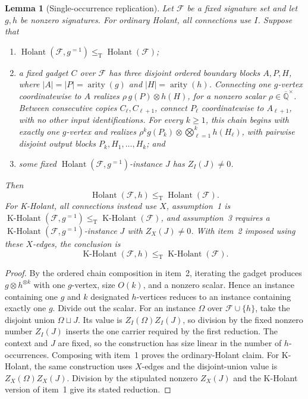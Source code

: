 \documentclass[11pt,letterpaper,onecolumn]{article}
\theoremstyle{plain}
\newtheorem{lemma}[lemma]{Lemma}
\theoremstyle{definition}
\theoremstyle{remark}
\newcommand{\AlgNums}{\overline{\mathbb Q}}
\newcommand{\cF}{\mathcal F}
\newcommand{\Holant}{\operatorname{Holant}}
\newcommand{\KHolant}{\operatorname{K\text{-}Holant}}
\newcommand{\arity}{\operatorname{arity}}
\newcommand{\leT}{\leq_{\mathrm T}}
\begin{document}
\begin{lemma}[Single-occurrence replication]
\label{lem:single-occurrence-replication}
Let \(\cF\) be a fixed signature set and let \(g,h\) be nonzero signatures.  For ordinary Holant, all connections use \(I\). Suppose that
\begin{enumerate}
\item \(\Holant(\cF,g^{=1})\leT\Holant(\cF)\);
\item a fixed gadget \(C\) over \(\cF\) has three disjoint ordered
      boundary blocks \(A,P,H\), where
      \(|A|=|P|=\arity(g)\) and \(|H|=\arity(h)\).
      Connecting one \(g\)-vertex coordinatewise to \(A\) realizes
      \(\rho\,g(P)\otimes h(H)\), for a nonzero scalar
      \(\rho\in\AlgNums^\times\). Between consecutive copies
      \(C_\ell,C_{\ell+1}\), connect \(P_\ell\) coordinatewise to
      \(A_{\ell+1}\), with no other input identifications.
      For every \(k\ge1\), this chain begins with exactly one
      \(g\)-vertex and realizes
      \(\rho^k g(P_k)\otimes\bigotimes_{\ell=1}^k h(H_\ell)\), with
      pairwise disjoint output blocks \(P_k,H_1,\ldots,H_k\); and
\item some fixed \(\Holant(\cF,g^{=1})\)-instance \(J\) has
      \(Z_I(J)\ne0\).
\end{enumerate}
Then
\[
  \Holant(\cF,h)\leT\Holant(\cF).
\]
For K-Holant, all connections instead use \(X\), assumption~1 is
\(\KHolant(\cF,g^{=1})\leT\KHolant(\cF)\), and assumption~3
requires a \(\KHolant(\cF,g^{=1})\)-instance \(J\) with \(Z_X(J)\ne0\).
With item~2 imposed using these \(X\)-edges, the conclusion is
\[
  \KHolant(\cF,h)\leT\KHolant(\cF).
\]
\end{lemma}

\begin{proof}
By the ordered chain composition in item~2, iterating the gadget
produces \(g\otimes h^{\otimes k}\) with one \(g\)-vertex, size \(O(k)\),
and a nonzero scalar.  Hence an instance containing one \(g\) and \(k\) designated
\(h\)-vertices reduces to an instance containing exactly one \(g\). Divide
out the scalar.  For an instance \(\Omega\) over \(\cF\cup\{h\}\), take the
disjoint union \(\Omega\sqcup J\).  Its value is
\(Z_I(\Omega)Z_I(J)\), so division by
the fixed nonzero number \(Z_I(J)\) inserts the one carrier required by the
first reduction.  The context and \(J\) are fixed, so the construction has
size linear in the number of \(h\)-occurrences.  Composing with item~1
proves the ordinary-Holant claim. For K-Holant, the same construction
uses \(X\)-edges and the disjoint-union value is
\(Z_X(\Omega)Z_X(J)\). Division by the stipulated nonzero \(Z_X(J)\)
and the K-Holant version of item~1 give its stated reduction.
\end{proof}
\end{document}
